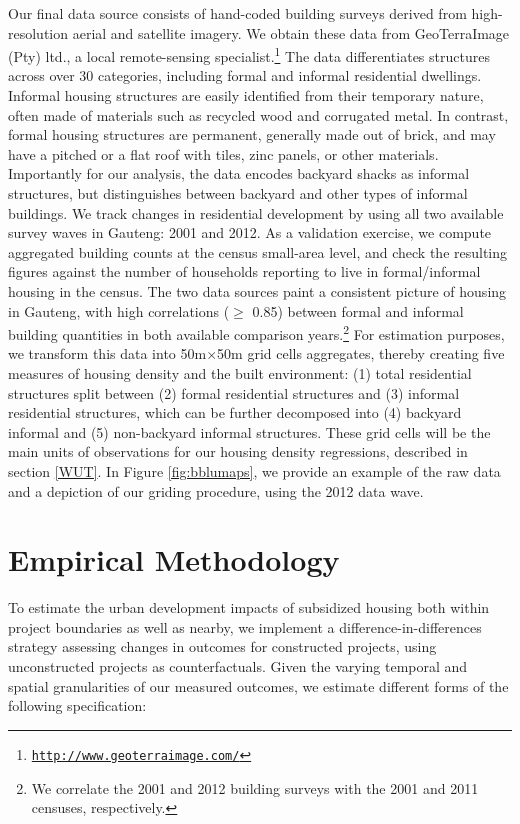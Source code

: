 \documentclass[12pt]{article}
\begin{document}
Our final data source consists of hand-coded building surveys derived from high-resolution aerial and satellite imagery. We obtain these data from GeoTerraImage (Pty) ltd., a local remote-sensing specialist.\footnote{\href{http://www.geoterraimage.com/}{\tt http://www.geoterraimage.com/}} The data differentiates structures across over 30 categories, including formal and informal residential dwellings. Informal housing structures are easily identified from their temporary nature, often made of materials such as recycled wood and corrugated metal. In contrast, formal housing structures are permanent, generally made out of brick, and may have a pitched or a flat roof with tiles, zinc panels, or other materials. Importantly for our analysis, the data encodes backyard shacks as informal structures, but distinguishes between backyard and other types of informal buildings. We track changes in residential development by using all two available survey waves in Gauteng: 2001 and 2012. As a validation exercise, we compute aggregated building counts at the census small-area level, and check the resulting figures against the number of households reporting to live in formal/informal housing in the census. The two data sources paint a consistent picture of housing in Gauteng, with high correlations ($\geq$ 0.85) between formal and informal building quantities in both available comparison years.\footnote{We correlate the 2001 and 2012 building surveys with the 2001 and 2011 censuses, respectively.} For estimation purposes, we transform this data into 50m$\times$50m grid cells aggregates, thereby creating five measures of housing density and the built environment: (1) total residential structures split between (2) formal residential structures and (3) informal residential structures, which can be further decomposed into (4) backyard informal and (5) non-backyard informal structures.  These grid cells will be the main units of observations for our housing density regressions, described in section \ref{WUT}. In Figure \ref{fig:bblumaps}, we provide an example of the raw data and a depiction of our griding procedure, using the 2012 data wave.

\section{Empirical Methodology}\label{section:methodology}

To estimate the urban development impacts of subsidized housing both within project boundaries as well as nearby, we implement a difference-in-differences strategy assessing changes in outcomes for constructed projects, using unconstructed projects as counterfactuals. Given the varying temporal and spatial granularities of our measured outcomes, we estimate different forms of the following specification:
\end{document}
